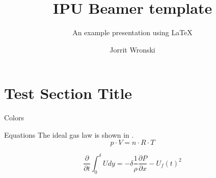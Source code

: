 \documentclass[aspectratio=169,hyperref={pdfpagelabels=false}]{beamer}
\subtitle{An example presentation using \LaTeX}
\title{IPU Beamer template}
\author{Jorrit Wronski}
\begin{document}
\inserttitlepage

\section{Test Section Title}

\begin{frame}{Colors}
\begin{testcolors}[rgb]


\end{testcolors}
\end{frame}

%

\begin{frame}{Equations}
The ideal gas law is shown in .
\begin{equation}
    p \cdot V = n \cdot R \cdot T
\end{equation}

\begin{equation} \label{eq:IME}
    \frac{\partial}{\partial t} \int_{0}^{\delta} U dy = - \delta \frac{1}{\rho}\frac{\partial P}{\partial x}-U_f(t)^2
\end{equation}

\end{frame}
\end{document}
